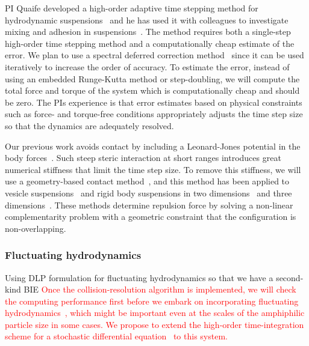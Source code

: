 PI Quaife developed a high-order adaptive time stepping method for
hydrodynamic suspensions~\cite{qua-bir2016} and he has used it with
colleagues to investigate mixing and adhesion in
suspensions~\cite{qua-vee-you2019, kab-qua-bir2017}. The method requires
both a single-step high-order time stepping method and a computationally
cheap estimate of the error. We plan to use a spectral deferred
correction method~\cite{dut-gre-rok2000} since it can be used
iteratively to increase the order of accuracy. To estimate the error,
instead of using an embedded Runge-Kutta method or step-doubling, we
will compute the total force and torque of the system which is
computationally cheap and should be zero. The PIs experience is that
error estimates based on physical constraints such as force- and
torque-free conditions appropriately adjusts the time step size so that
the dynamics are adequately resolved.

Our previous work avoids contact by including a Leonard-Jones potential
in the body forces~\cite{Fu2018_SIAM}. Such steep steric interaction at
short ranges introduces great numerical stiffness that limit the time
step size. To remove this stiffness, we will use a geometry-based
contact method~\cite{har-pon-sor-zor2011}, and this method has been
applied to vesicle suspensions~\cite{lu-rah-zor2017} and rigid body
suspensions in two dimensions~\cite{bys-sha-qua2020} and
three dimensions~\cite{Yan2019}. These methods determine repulsion
force by solving a non-linear complementarity problem with a geometric
constraint that the configuration is non-overlapping.


\subsubsection{Fluctuating hydrodynamics}
\label{subsec:fluctuating}
Using DLP formulation for fluctuating hydrodynamics so that we have a
second-kind BIE
\textcolor{red}{
Once the collision-resolution algorithm is implemented, we will check
the computing performance first before we embark on incorporating
fluctuating hydrodynamics~\cite{Bao17,Bao18}, which might be important
even at the scales of the amphiphilic particle size in some cases. We
propose to extend the high-order time-integration scheme for a
stochastic differential equation~\cite{fu2015pre} to this system.
}




